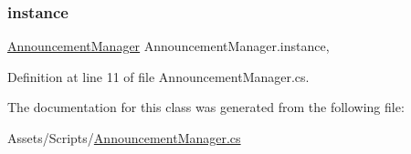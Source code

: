 \subsubsection{\texorpdfstring{instance}{instance}}
{\footnotesize\ttfamily \mbox{\hyperlink{class_announcement_manager}{Announcement\+Manager}} Announcement\+Manager.\+instance\hspace{0.3cm}{\ttfamily [static]}, {\ttfamily [get]}}



Definition at line 11 of file Announcement\+Manager.\+cs.



The documentation for this class was generated from the following file\+:\begin{DoxyCompactItemize}
\item 
Assets/\+Scripts/\mbox{\hyperlink{_announcement_manager_8cs}{Announcement\+Manager.\+cs}}\end{DoxyCompactItemize}
